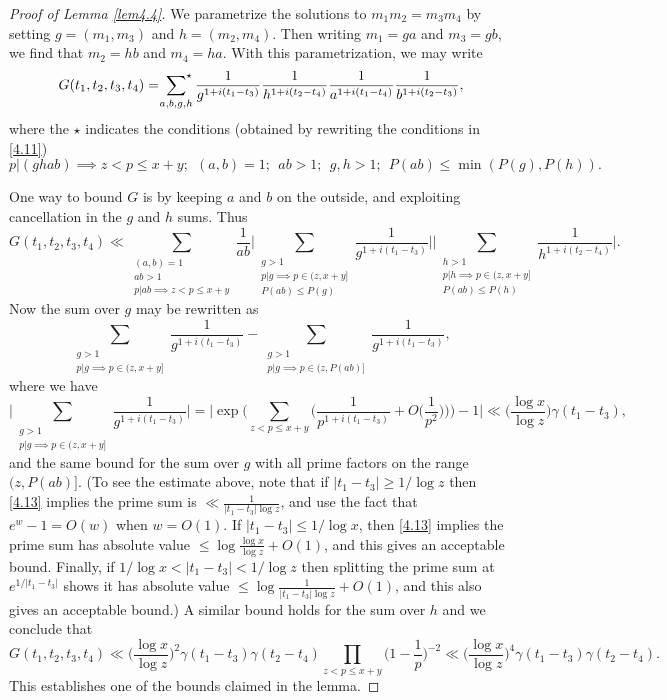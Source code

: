 \documentclass[12pt, notitlepage]{amsart}
\numberwithin{equation}{section}
\def\rsum{\sideset{_{} ^{}} {_{} ^{\star}}{\sum }}
\theoremstyle{remark}
\theoremstyle{definition}
\theoremstyle{remark}
\numberwithin{equation}{section}
\begin{document}
\begin{proof}[Proof of Lemma \ref{lem4.4}]  We parametrize the solutions to $m_1 m_2 = m_3 m_4$ by setting $g= (m_1, m_3)$ and $h=(m_2,m_4)$.  Then writing $m_1 = ga$ and $m_3= gb$, we find that $m_2=hb$ and $m_4=ha$.   With this parametrization, we may write 
$$ 
G(t_1, t_2, t_3, t_4) = \rsum_{a, b, g, h} \frac{1}{g^{1+i(t_1-t_3)}} \frac{1}{h^{1+i(t_2-t_4)}} \frac{1}{a^{1+i(t_1-t_4)}} \frac{1}{b^{1+i(t_2-t_3)}}, 
$$ 
where the $\star$ indicates the conditions (obtained by rewriting the conditions in \eqref{4.11}) 
$$
p|(ghab) \implies z < p\le x+y; \ \ (a,b)=1; \ \ ab >1; \ \ g, h >1; \ \ P(ab) \le \min(P(g), P(h)). 
$$ 
 
 One way to bound $G$ is by keeping $a$ and $b$ on the outside, and exploiting cancellation in the $g$ and $h$ sums.  Thus 
 $$ 
 G(t_1, t_2, t_3, t_4) \ll \sum_{\substack{ (a,b)=1 \\ ab >1 \\ p|ab \implies z < p\le x+y}} \frac {1}{ab} \Big| \sum_{\substack{ g> 1 \\ p|g \implies p\in (z,x+y] \\ P(ab) \le P(g)}} \frac{1}{g^{1+i(t_1-t_3)}} 
 \Big| \Big| \sum_{\substack{h> 1 \\ p|h \implies p\in (z,x+y] \\ P(ab) \le P(h)}} \frac{1}{h^{1+i(t_2-t_4)}}\Big|. 
 $$ 
Now the sum over $g$ may be rewritten as
$$ \sum_{\substack{ g> 1 \\ p|g \implies p\in (z,x+y]}} \frac{1}{g^{1+i(t_1-t_3)}} - \sum_{\substack{ g> 1 \\ p|g \implies p\in (z,P(ab)]}} \frac{1}{g^{1+i(t_1-t_3)}} , $$
where we have 
 $$ 
\Big| \sum_{\substack{ g> 1 \\ p|g \implies p\in (z,x+y]}} \frac{1}{g^{1+i(t_1-t_3)}} \Big| = \Big| \exp\Big( \sum_{z < p\le x+y} \Big(\frac{1}{p^{1+i(t_1-t_3)}} +O\Big(\frac{1}{p^2}\Big)\Big)\Big) -1 \Big| \ll \Big(\frac{\log x}{\log z}\Big) \gamma(t_1-t_3) ,
 $$ 
and the same bound for the sum over $g$ with all prime factors on the range $(z,P(ab)]$. (To see the estimate above, note that if $|t_1 - t_3| \geq 1/\log z$ then \eqref{4.13} implies the prime sum is $\ll \frac{1}{|t_1 - t_3| \log z}$, and use the fact that $e^w-1=O(w)$ when $w=O(1)$. If $|t_1 - t_3| \leq 1/\log x$, then \eqref{4.13} implies the prime sum has absolute value $\le \log \frac{\log x}{\log z} + O(1)$, and this gives an acceptable bound. Finally, if $1/\log x < |t_1 - t_3| < 1/\log z$ then splitting the prime sum at $e^{1/|t_1 - t_3|}$ shows it has absolute value $\le \log \frac{1}{|t_1 - t_3|\log z} + O(1)$, and this also gives an acceptable bound.)
 A similar bound holds for the sum over $h$ and we conclude that 
 $$ 
 G(t_1, t_2, t_3, t_4) \ll \Big(\frac{\log x}{\log z}\Big)^2 \gamma(t_1-t_3)\gamma(t_2-t_4) \prod_{z < p\le x+y} \Big(1-\frac 1p\Big)^{-2} 
 \ll  \Big(\frac{\log x}{\log z}\Big)^4 \gamma(t_1-t_3)\gamma(t_2-t_4).
 $$ 
 This establishes one of the bounds claimed in the lemma. 
 

\end{proof}
\end{document}
